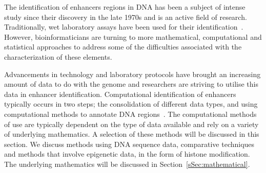 
        The identification of enhancers regions in DNA has been a subject of intense study since their discovery in the late 1970s and is an active field of research. Traditionally, wet laboratory assays have been used for their identification~\cite{rosenthal198772}. However, bioinformaticians are turning to more mathematical, computational and statistical approaches to address some of the difficulties associated with the characterization of these elements. 
        
        Advancements in technology and laboratory protocols have brought an increasing amount of data to do with the genome and researchers are striving to utilise this data in enhancer identification. Computational identification of enhancers typically occurs in two steps; the consolidation of different data types, and using computational methods to annotate DNA regions~\cite{kleftogiannis2015progress}. The computational methods of use are typically dependent on the type of data available and rely on a variety of underlying mathematics. A selection of these methods will be discussed in this section. We discuss methods using DNA sequence data, comparative techniques and methods that involve epigenetic data, in the form of histone modification. The underlying mathematics will be discussed in Section~\ref{sSec:mathematical}.
        
        
        

